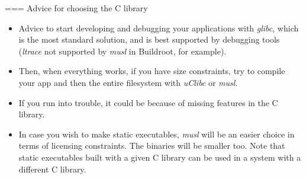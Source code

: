=== Advice for choosing the C library
  \begin{itemize}
  \item Advice to start developing and debugging your applications with
        {\em glibc}, which is the most standard solution, and is best
        supported by debugging tools ({\em ltrace} not supported by {\em
        musl} in Buildroot, for example).
  \item Then, when everything works, if you have size constraints, try to compile
        your app and then the entire filesystem with {\em uClibc} or {\em musl}.
  \item If you run into trouble, it could be because of missing features
        in the C library.
  \item In case you wish to make static executables, {\em musl} will be
        an easier choice in terms of licensing constraints.
	The binaries will be smaller too.
        Note that static executables built with a given C library
        can be used in a system with a different C library.
  \end{itemize}

